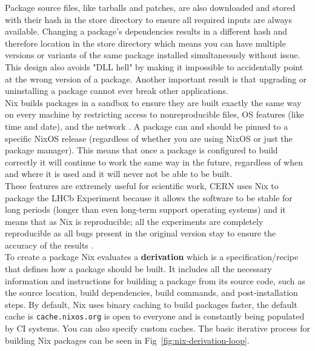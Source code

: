 Package source files, like tarballs and patches, are also downloaded and stored with their hash in the store directory to ensure all required inputs are always available. Changing a package's dependencies results in a different hash and therefore location in the store directory which means you can have multiple versions or variants of the same package installed simultaneously without issue. This design also avoids "DLL hell" by making it impossible to accidentally point at the wrong version of a package. Another important result is that upgrading or uninstalling a package cannot ever break other applications. \\

Nix builds packages in a sandbox to ensure they are built exactly the same way on every machine by restricting access to nonreproducible files, OS features (like time and date), and the network \cite{nixcon-sandboxs}. A package can and should be pinned to a specific NixOS release (regardless of whether you are using NixOS or just the package manager). This means that once a package is configured to build correctly it will continue to work the same way in the future, regardless of when and where it is used and it will never not be able to be built. \\

These features are extremely useful for scientific work, CERN uses Nix to package the LHCb Experiment because it allows the software to be stable for long periods (longer than even long-term support operating systems) and it means that as Nix is reproducible; all the experiments are completely reproducible as all bugs present in the original version stay to ensure the accuracy of the results \cite{LHCbNix}. \\

To create a package Nix evaluates a \textbf{derivation} which is a specification/recipe that defines how a package should be built. It includes all the necessary information and instructions for building a package from its source code, such as the source location, build dependencies, build commands, and post-installation steps. By default, Nix uses binary caching to build packages faster, the default cache is \texttt{cache.nixos.org} is open to everyone and is constantly being populated by CI systems. You can also specify custom caches. The basic iterative process for building Nix packages can be seen in Fig~\ref{fig:nix-derivation-loop}.


